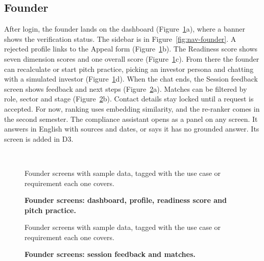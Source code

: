\documentclass{FastFyp}
\makeatletter
\newcommand{\capdesc}[1]{%
  \par\nobreak
  \begingroup
  \setstretch{1}%
  \ifdefstring{\@captype}{figure}%
    {\vspace{0.2\baselineskip}}%
    {\vspace{-0.8\baselineskip}}%
  {\centering\normalfont\itshape\small
   \begin{minipage}{0.92\textwidth}\centering #1\end{minipage}\par}%
  \endgroup
  \vspace{0.4\baselineskip}%
}
\makeatother
\begin{document}
\subsection{Founder}
After login, the founder lands on the dashboard (Figure~\ref{fig:gui-founder-1}a), where a banner shows the verification status. The sidebar is in Figure~\ref{fig:nav-founder}. A rejected profile links to the Appeal form (Figure~\ref{fig:gui-founder-1}b). The Readiness score shows seven dimension scores and one overall score (Figure~\ref{fig:gui-founder-1}c). From there the founder can recalculate or start pitch practice, picking an investor persona and chatting with a simulated investor (Figure~\ref{fig:gui-founder-1}d). When the chat ends, the Session feedback screen shows feedback and next steps (Figure~\ref{fig:gui-founder-2}a). Matches can be filtered by role, sector and stage (Figure~\ref{fig:gui-founder-2}b). Contact details stay locked until a request is accepted. For now, ranking uses embedding similarity, and the re-ranker comes in the second semester. The compliance assistant opens as a panel on any screen. It answers in English with sources and dates, or says it has no grounded answer. Its screen is added in D3.

\begin{figure}[H]
\centering
{}\hfill
{}\\[6pt]
\hfill
{}
{\caption{\label{fig:gui-founder-1}\textbf{Founder screens: dashboard, profile, readiness score and pitch practice.}}}
\capdesc{Founder screens with sample data, tagged with the use case or requirement each one covers.}
\end{figure}

\begin{figure}[H]
\centering
{}\hfill
{}
{\caption{\label{fig:gui-founder-2}\textbf{Founder screens: session feedback and matches.}}}
\capdesc{Founder screens with sample data, tagged with the use case or requirement each one covers.}
\end{figure}
\end{document}
